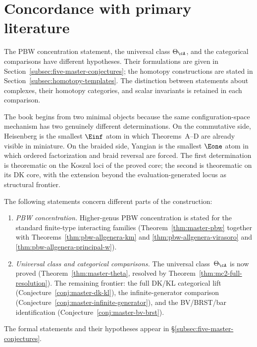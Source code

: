 \chapter{Concordance with primary literature}
\label{chap:concordance}


\begin{remark}\label{rem:constitutional}
The PBW concentration statement, the universal class $\Theta_\cA$, and the
categorical comparisons have different hypotheses.
Their formulations are given in Section~\ref{subsec:five-master-conjectures};
the homotopy constructions are stated in Section~\ref{subsec:homotopy-templates}.
The distinction between statements about complexes, their homotopy categories,
and scalar invariants is retained in each comparison.
\end{remark}

The book begins from two minimal objects because the same
configuration-space mechanism has two genuinely different
determinations.  On the commutative side, Heisenberg is the smallest
$\Einf$ atom in which Theorems~A--D are already visible in miniature.
On the braided side, Yangian is the smallest $\Eone$ atom in which
ordered factorization and braid reversal are forced.  The first
determination is theorematic on the Koszul loci of the proved core; the
second is theorematic on its DK core, with the extension beyond the
evaluation-generated locus as structural frontier.

\begin{remark}
The following statements concern different parts of the construction:
\begin{enumerate}[label=\textup{(\roman*)}]
\item \emph{PBW concentration.}  Higher-genus PBW concentration is
  stated for the standard finite-type interacting families
  (Theorem~\ref{thm:master-pbw} together with
  Theorems~\ref{thm:pbw-allgenera-km} and
  \ref{thm:pbw-allgenera-virasoro} and
  \ref{thm:pbw-allgenera-principal-w}).
\item \emph{Universal class and categorical comparisons.}
  The universal class~$\Theta_\cA$ is now proved
  (Theorem~\ref{thm:master-theta}, resolved by
  Theorem~\ref{thm:mc2-full-resolution}).  The remaining frontier:
  the full DK/KL categorical lift
  (Conjecture~\ref{conj:master-dk-kl}), the infinite-generator
  comparison (Conjecture~\ref{conj:master-infinite-generator}),
  and the BV/BRST/bar identification
  (Conjecture~\ref{conj:master-bv-brst}).
\end{enumerate}
The formal statements and their hypotheses appear in
\S\ref{subsec:five-master-conjectures}.
\end{remark}

